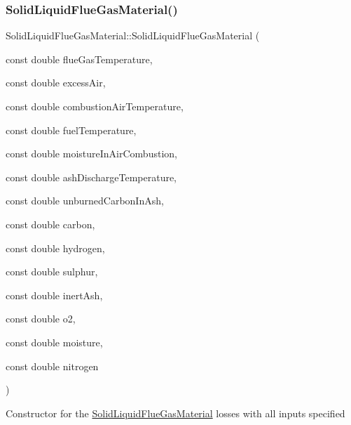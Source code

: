 \subsubsection{\texorpdfstring{Solid\+Liquid\+Flue\+Gas\+Material()}{SolidLiquidFlueGasMaterial()}\hspace{0.1cm}{\footnotesize\ttfamily [3/3]}}
{\footnotesize\ttfamily Solid\+Liquid\+Flue\+Gas\+Material\+::\+Solid\+Liquid\+Flue\+Gas\+Material (\begin{DoxyParamCaption}\item[{const double}]{flue\+Gas\+Temperature,  }\item[{const double}]{excess\+Air,  }\item[{const double}]{combustion\+Air\+Temperature,  }\item[{const double}]{fuel\+Temperature,  }\item[{const double}]{moisture\+In\+Air\+Combustion,  }\item[{const double}]{ash\+Discharge\+Temperature,  }\item[{const double}]{unburned\+Carbon\+In\+Ash,  }\item[{const double}]{carbon,  }\item[{const double}]{hydrogen,  }\item[{const double}]{sulphur,  }\item[{const double}]{inert\+Ash,  }\item[{const double}]{o2,  }\item[{const double}]{moisture,  }\item[{const double}]{nitrogen }\end{DoxyParamCaption})\hspace{0.3cm}{\ttfamily [inline]}}

Constructor for the \hyperlink{class_solid_liquid_flue_gas_material}{Solid\+Liquid\+Flue\+Gas\+Material} losses with all inputs specified



